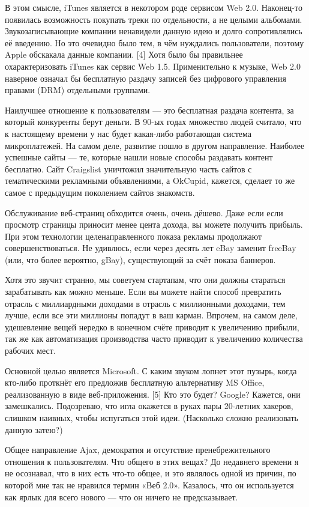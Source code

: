 \documentclass[ebook,12pt,oneside,openany]{memoir}
\begin{document}
В этом смысле, iTunes является в некотором роде сервисом Web 2.0.
Наконец-то появилась возможность покупать треки по отдельности, а не
целыми альбомами. Звукозаписывающие компании ненавидели данную идею и
долго сопротивлялись её введению. Но это очевидно было тем, в чём
нуждались пользователи, поэтому Apple обскакала данные компании. [4]
Хотя было бы правильнее охарактеризовать iTunes как сервис Web 1.5.
Применительно к музыке, Web 2.0 наверное означал бы бесплатную раздачу
записей без цифрового управления правами (DRM) отдельными группами.

Наилучшее отношение к пользователям — это бесплатная раздача контента,
за который конкуренты берут деньги. В 90-ых годах множество людей
считало, что к настоящему времени у нас будет какая-либо работающая
система микроплатежей. На самом деле, развитие пошло в другом
направление. Наиболее успешные сайты — те, которые нашли новые способы
раздавать контент бесплатно. Сайт Craigslist уничтожил значительную
часть сайтов с тематическими рекламными объявлениями, а OkCupid,
кажется, сделает то же самое с предыдущим поколением сайтов знакомств.

Обслуживание веб-страниц обходится очень, очень дёшево. Даже если если
просмотр страницы приносит менее цента дохода, вы можете получить
прибыль. При этом технологии целенаправленного показа рекламы
продолжают совершенствоваться. Не удивлюсь, если через десять лет eBay
заменит freeBay (или, что более вероятно, gBay), существующий за счёт
показа баннеров.

Хотя это звучит странно, мы советуем стартапам, что они должны
стараться зарабатывать как можно меньше. Если вы можете найти способ
превратить отрасль с миллиардными доходами в отрасль с миллионными
доходами, тем лучше, если все эти миллионы попадут в ваш карман.
Впрочем, на самом деле, удешевление вещей нередко в конечном счёте
приводит к увеличению прибыли, так же как автоматизация производства
часто приводит к увеличению количества рабочих мест.

Основной целью является Microsoft. С каким звуком лопнет этот пузырь,
когда кто-либо проткнёт его предложив бесплатную альтернативу MS
Office, реализованную в виде веб-приложения. [5] Кто это будет?
Google? Кажется, они замешкались. Подозреваю, что игла окажется в
руках пары 20-летних хакеров, слишком наивных, чтобы испугаться этой
идеи. (Насколько сложно реализовать данную затею?)

Общее направление Ajax, демократия и отсутствие пренебрежительного
отношения к пользователям. Что общего в этих вещах? До недавнего
времени я не осознавал, что в них есть что-то общее, и это являлось
одной из причин, по которой мне так не нравился термин «Веб 2.0».
Казалось, что он используется как ярлык для всего нового — что он
ничего не предсказывает.
\end{document}

